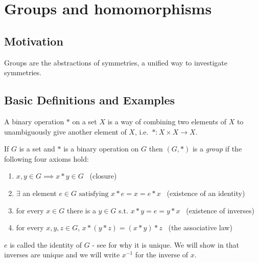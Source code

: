 \section{Groups and homomorphisms}

\hypertarget{motivation}{%
\subsection{Motivation}\label{motivation}}

Groups are the abstractions of symmetries, a unified way to investigate symmetries.

\hypertarget{basic-definitions-and-examples}{%
\subsection{Basic Definitions and Examples}\label{basic-definitions-and-examples}}

\begin{definition}
  A binary operation $*$ on a set $X$ is a way of combining two elements of $X$ to unambiguously give another element of $X$,
i.e.~$*: X \times X \to X$.
\end{definition} 

\begin{definition}[Group]

If $G$ is a set and $*$ is a binary operation on $G$ then $(G, *)$ is a \emph{group} if the following four axioms hold:

\begin{enumerate}
\def\labelenumi{\arabic{enumi}.}
\item
  $x, y \in G \implies x * y \in G$ \hfill~{(closure)}
\item
  $\exists$ an element $e \in G \text{ satisfying } x * e = x = e * x$ \hfill~{(existence of an identity)}
\item
  for every $x \in G$ there is a $y \in G$ s.t. $x * y = e = y * x$ \hfill~{(existence of inverses)}
\item
  for every $x, y, z \in G$, $x * (y * z) = (x * y) * z$ \hfill~{(the associative law)}
\end{enumerate}

\end{definition}

\begin{remark}
$e$ is called the identity of $G$ - see  for why it is unique.
We will show in  that inverses are unique and we will write $x^{-1}$ for the inverse of $x$.
\end{remark}

